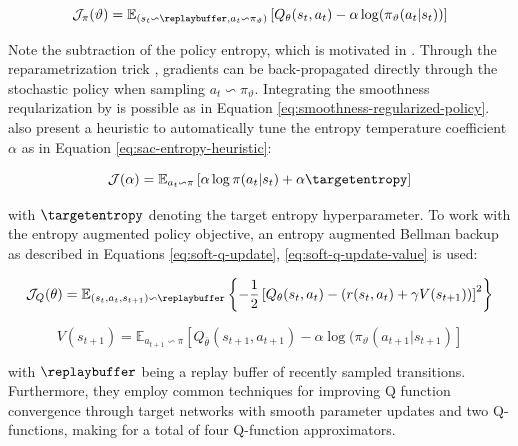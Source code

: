 \begin{equation}
  \mathcal{J}_{\pi}(\vartheta) = \mathbb{E}_{(s_t \backsim \replaybuffer, a_t \backsim \pi_{\vartheta})} \left[Q_{\theta}(s_t, a_t) - \alpha \log(\pi_{\vartheta}(a_t | s_t))  \right]
  \label{eq:soft-policy-update}
\end{equation}

Note the subtraction of the policy entropy, which is motivated in \cite[Equation 4]{haarnojaSoftActorCriticAlgorithms2019}. Through the reparametrization trick \cite[Equation 8,9]{haarnojaSoftActorCriticAlgorithms2019}, gradients can be back-propagated directly through the stochastic policy when sampling $a_t \backsim \pi_{\vartheta}$. Integrating the smoothness reqularization by \citet{mysoreRegularizingActionPolicies2021} is possible as in Equation \ref{eq:smoothness-regularized-policy}. \citet[Chapter 5]{haarnojaSoftActorCriticAlgorithms2019} also present a heuristic to automatically tune the entropy temperature coefficient $\alpha$ as in Equation \ref{eq:sac-entropy-heuristic}:

\begin{equation}
  \mathcal{J}(\alpha) = \mathbb{E}_{a_t \backsim \pi} \left[\alpha \log \pi(a_t | s_t) + \alpha \targetentropy \right]
  \label{eq:sac-entropy-heuristic}
\end{equation}

with $\targetentropy$ denoting the target entropy hyperparameter. To work with the entropy augmented policy objective, an entropy augmented Bellman backup as described in Equations \ref{eq:soft-q-update}, \ref{eq:soft-q-update-value} is used:

\begin{equation}
  \mathcal{J}_Q(\theta) = \mathbb{E}_{(s_t, a_t, s_{t+1}) \backsim \replaybuffer} \left\{ -\frac{1}{2} \left[ Q_{\theta}(s_t, a_t) - (r(s_t, a_t) + \gamma V(s_{t+1}) )\right]^2 \right\}
  \label{eq:soft-q-update}
\end{equation}

\begin{equation}
  V(s_{t+1}) = \mathbb{E}_{a_{t+1} \backsim \pi} \left[ Q_{\bar{\theta}} (s_{t+1}, a_{t+1}) - \alpha \log(\pi_{\vartheta}(a_{t+1} | s_{t+1}) \right]
  \label{eq:soft-q-update-value}
\end{equation}

with $\replaybuffer$ being a replay buffer of recently sampled transitions. Furthermore, they employ common techniques for improving Q function convergence through target networks with smooth parameter updates and two Q-functions, making for a total of four Q-function approximators.

